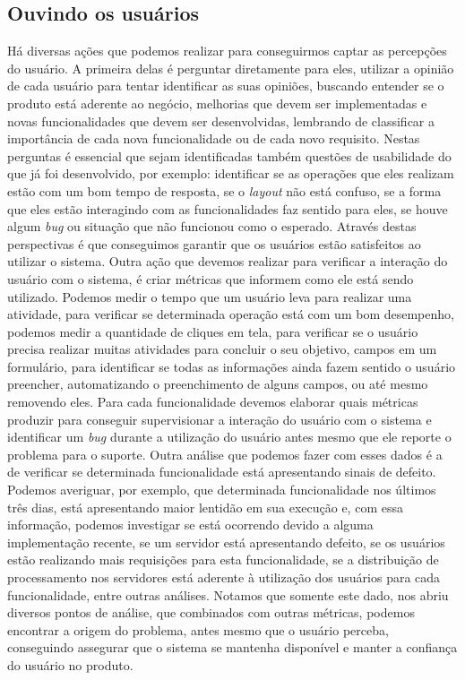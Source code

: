     \subsection{Ouvindo os usuários}
      Há diversas ações que podemos realizar para conseguirmos captar as percepções
      do usuário. A primeira delas é perguntar diretamente para eles, utilizar
      a opinião de cada usuário para tentar identificar as suas opiniões, buscando
      entender se o produto está aderente ao negócio, melhorias que devem ser
      implementadas e novas funcionalidades que devem ser desenvolvidas,
      lembrando de classificar a importância de cada nova funcionalidade ou de
      cada novo requisito. Nestas perguntas é essencial que sejam identificadas
      também questões de usabilidade do que já foi desenvolvido, por exemplo:
      identificar se as operações que eles realizam estão com um bom tempo de
      resposta, se o \textit{layout} não está confuso, se a forma que eles estão
      interagindo com as funcionalidades faz sentido para eles, se houve algum
      \textit{bug} ou situação que não funcionou como o esperado. Através destas
      perspectivas é que conseguimos garantir que os usuários estão satisfeitos
      ao utilizar o sistema. \newline
      Outra ação que devemos realizar para verificar a interação do usuário com o
      sistema, é criar métricas que informem como ele está sendo utilizado. Podemos
      medir o tempo que um usuário leva para realizar uma atividade, para verificar
      se determinada operação está com um bom desempenho, podemos medir a quantidade de
      cliques em tela, para verificar se o usuário precisa realizar muitas atividades
      para concluir o seu objetivo, campos em um formulário, para identificar se
      todas as informações ainda fazem sentido o usuário preencher, automatizando
      o preenchimento de alguns campos, ou até mesmo removendo eles. Para cada
      funcionalidade devemos elaborar quais métricas produzir para conseguir
      supervisionar a interação do usuário com o sistema e identificar um \textit{bug}
      durante a utilização do usuário antes mesmo que ele reporte o problema para
      o suporte. Outra análise que podemos fazer com esses dados é a de verificar
      se determinada funcionalidade está apresentando sinais de defeito. Podemos
      averiguar, por exemplo, que determinada funcionalidade nos últimos três dias,
      está apresentando maior lentidão em sua execução e, com essa informação, podemos
      investigar se está ocorrendo devido a alguma implementação recente, se um
      servidor está apresentando defeito, se os usuários estão realizando mais
      requisições para esta funcionalidade, se a distribuição de processamento nos
      servidores está aderente à utilização dos usuários para cada funcionalidade,
      entre outras análises. Notamos que somente este dado, nos abriu diversos pontos
      de análise, que combinados com outras métricas, podemos encontrar a origem
      do problema, antes mesmo que o usuário perceba, conseguindo assegurar que
      o sistema se mantenha disponível e manter a confiança do usuário no produto.

